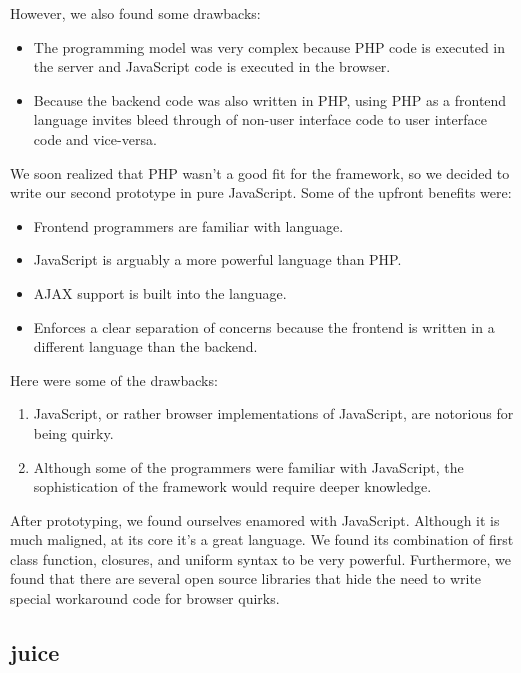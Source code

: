 \documentclass[10pt, twocolumn]{article}
\begin{document}
However, we also found some drawbacks:

\begin{itemize}
\item The programming model was very complex because PHP code is
  executed in the server and JavaScript code is executed in the
  browser.
\item Because the backend code was also written in PHP, using PHP
  as a frontend language invites bleed through of non-user
  interface code to user interface code and vice-versa.
\end{itemize}

We soon realized that PHP wasn't a good fit for the framework, so
we decided to write our second prototype in pure JavaScript. Some
of the upfront benefits were:

\begin{itemize}
\item Frontend programmers are familiar with language.
\item JavaScript is arguably a more powerful language than PHP.
\item AJAX support is built into the language.
\item Enforces a clear separation of concerns because the frontend
  is written in a different language than the backend.
\end{itemize}

Here were some of the drawbacks:

\begin{enumerate}
\item JavaScript, or rather browser implementations of JavaScript,
  are notorious for being quirky.
\item Although some of the programmers were familiar with
  JavaScript, the sophistication of the framework would require
  deeper knowledge.
\end{enumerate}

After prototyping, we found ourselves enamored with JavaScript.
Although it is much maligned, at its core it's a great language.
We found its combination of first class function, closures, and
uniform syntax to be very powerful. Furthermore, we found that
there are several open source libraries that hide the need to
write special workaround code for browser quirks.

\subsection{juice}
\end{document}
